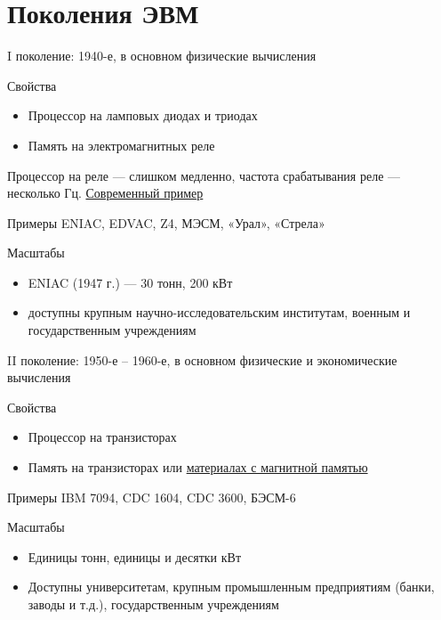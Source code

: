 \documentclass[xetex,aspectratio=43]{beamer}
\begin{document}
\section{Поколения ЭВМ}

\begin{frame}{I поколение: 1940-е, в основном физические вычисления}

	\begin{block}{Свойства}
		\begin{itemize}
			\item
			Процессор на ламповых диодах и триодах
			\item
			Память на электромагнитных реле
		\end{itemize}

		Процессор на реле --- слишком медленно, частота срабатывания реле ---
		несколько Гц. \href{https://youtu.be/5hhbGBlP3_4}{Современный пример}
	\end{block}

	\begin{block}{Примеры}
		ENIAC, EDVAC, Z4, МЭСМ, «Урал», «Стрела»
	\end{block}

	\begin{block}{Масштабы}
		\begin{itemize}
			\item
			ENIAC (1947 г.) --- 30 тонн, 200 кВт
			\item
			доступны крупным научно-исследовательским институтам, военным и
			государственным учреждениям
		\end{itemize}
	\end{block}
\end{frame}

\begin{frame}{II поколение: 1950-е -- 1960-е, в основном физические и экономические вычисления}

	\begin{block}{Свойства}
		\begin{itemize}
			\item
			Процессор на транзисторах
			\item
			Память на транзисторах или
			\href{https://en.wikipedia.org/wiki/Magnetic-core_memory}{материалах с
				магнитной памятью}
		\end{itemize}
	\end{block}

	\begin{block}{Примеры}
		IBM 7094, CDC 1604, CDC 3600, БЭСМ-6
	\end{block}

	\begin{block}{Масштабы}
		\begin{itemize}
			\item
			Единицы тонн, единицы и десятки кВт
			\item
			Доступны университетам, крупным промышленным предприятиям (банки,
			заводы и т.д.), государственным учреждениям
		\end{itemize}
	\end{block}
\end{frame}
\end{document}
